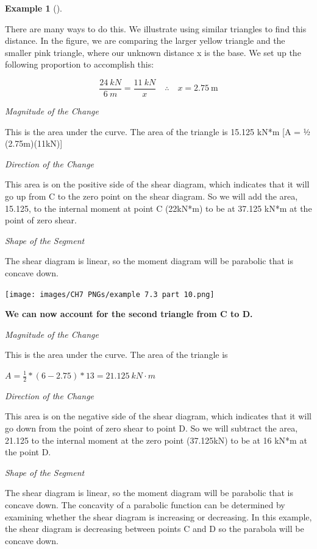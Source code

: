 \documentclass[
  letterpaper,
  DIV=11,
  numbers=noendperiod]{scrreprt}
\theoremstyle{definition}
\newtheorem{example}{Example}[chapter]
\theoremstyle{remark}
\begin{document}
\begin{tcolorbox}
\begin{example}[]
\begin{tcolorbox}
There are many ways to do this. We illustrate using similar triangles to
find this distance. In the figure, we are comparing the larger yellow
triangle and the smaller pink triangle, where our unknown distance x is
the base. We set up the following proportion to accomplish this:

\[
\frac{24{~kN}}{6{~m}}=\frac{11{~kN}}{x} \quad \therefore \quad x=2.75 \mathrm{~m}
\]

\emph{Magnitude of the Change}

This is the area under the curve. The area of the triangle is 15.125
kN*m {[}A = ½ (2.75m)(11kN){]}

\emph{Direction of the Change}

This area is on the positive side of the shear diagram, which indicates
that it will go up from C to the zero point on the shear diagram. So we
will add the area, 15.125, to the internal moment at point C (22kN*m) to
be at 37.125 kN*m at the point of zero shear.

\emph{Shape of the Segment}

The shear diagram is linear, so the moment diagram will be parabolic
that is concave down.

\begin{center}
\texttt{[image: images/CH7 PNGs/example 7.3 part 10.png]}
\end{center}

\textbf{We can now account for the second triangle from C to D.}

\emph{Magnitude of the Change}

This is the area under the curve. The area of the triangle is

\(A=\frac{1}{2}*(6-2.75)*13=21.125{~kN\cdot m}\)

\emph{Direction of the Change}

This area is on the negative side of the shear diagram, which indicates
that it will go down from the point of zero shear to point D. So we will
subtract the area, 21.125 to the internal moment at the zero point
(37.125kN) to be at 16 kN*m at the point D.

\emph{Shape of the Segment}

The shear diagram is linear, so the moment diagram will be parabolic
that is concave down. The concavity of a parabolic function can be
determined by examining whether the shear diagram is increasing or
decreasing. In this example, the shear diagram is decreasing between
points C and D so the parabola will be concave down.


\end{tcolorbox}
\end{example}
\end{tcolorbox}
\end{document}
